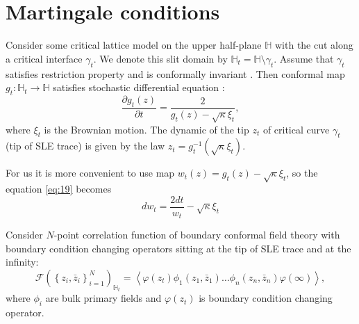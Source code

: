 \documentclass{jetpl}
\begin{document}
\section{Martingale conditions}
\label{sec:mart-cond}


 Consider some critical lattice model on the upper half-plane $\mathbb{H}$ with the cut along a critical interface $\gamma_{t}$. We denote this slit domain by $\mathbb{H}_{t}=\mathbb{H}\setminus \gamma_{t}$.  Assume that $\gamma_{t}$ satisfies restriction property and is conformally  invariant \cite{Cardy:2005kh}. Then  conformal map  $g_{t}:\mathbb{H}_{t}\to \mathbb{H}$ satisfies stochastic differential equation \cite{schramm2000scaling}:
\begin{equation}
\label{eq:19}
  \frac{\partial g_t(z)}{\partial t} = \frac{ 2}{g_t(z)-\sqrt{\kappa}\xi_{t}} ,
\end{equation}
where $\xi_{t}$ is the Brownian motion. The dynamic of the tip $z_{t}$ of critical curve $\gamma_{t}$ (tip of SLE trace) is given by the law $z_{t}=g_{t}^{-1}(\sqrt{\kappa}\xi_{t})$. 

For us it is more convenient to use map $w_{t} (z)=g_{t}(z)-\sqrt{\kappa}\xi_{t}$, so the equation \eqref{eq:19} becomes
\begin{equation}
  \label{eq:20}
       d w _{t}= \frac{2dt}{w_{t} }-\sqrt{\kappa}\xi_{t}  
\end{equation}

Consider  $N$-point correlation function of boundary conformal field theory with boundary condition changing operators sitting at the tip of SLE trace and at the infinity:
\begin{equation}
  \mathcal{F}(\left\{z_{i},\bar z_{i}\right\}_{i=1}^{N})_{\mathbb{H}_{t}}=
\left<\varphi(z_{t}) \phi_{1}(z_{1},\bar z_{1}) \dots \phi_{n}(z_{n},\bar z_{n})
      \varphi(\infty)\right>,
    \label{eq:2}
\end{equation}
where $\phi_{i}$ are bulk primary fields and $\varphi(z_{t})$ is boundary condition changing operator.
\end{document}

